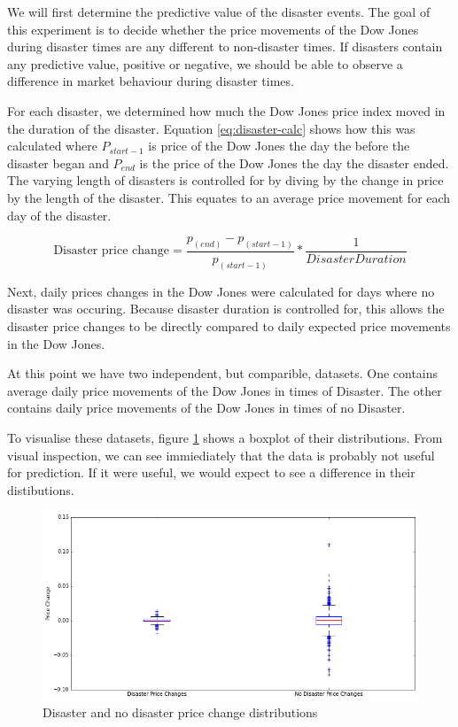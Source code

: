 \documentclass{report}
\begin{document}
We will first determine the predictive value of the disaster events. The goal of this experiment is to decide whether the price movements of the Dow Jones during disaster times are any different to non-disaster times. If disasters contain any predictive value, positive or negative, we should be able to observe a difference in market behaviour during disaster times.

For each disaster, we determined how much the Dow Jones price index moved in the duration of the disaster. Equation \ref{eq:disaster-calc} shows how this was calculated where $P_{start - 1}$ is price of the Dow Jones the day the before the disaster began and $P_{end}$ is the price of the Dow Jones the day the disaster ended. The varying length of disasters is controlled for by diving by the change in price by the length of the disaster. This equates to an average price movement for each day of the disaster. 

\begin{figure}[H]
\begin{center}
    \begin{equation}
      \text{Disaster price change} = \dfrac{p_{(end)} - p_{(start - 1)}} {p_{(start - 1)}} * \dfrac{1}{Disaster Duration}
      \label{eq:disaster-calc}
    \end{equation}
\end{center}
\end{figure}

Next, daily prices changes in the Dow Jones were calculated for days where no disaster was occuring. Because disaster duration is controlled for, this allows the disaster price changes to be directly compared to daily expected price movements in the Dow Jones.

At this point we have two independent, but comparible, datasets. One contains average daily price movements of the Dow Jones in times of Disaster. The other contains daily price movements of the Dow Jones in times of no Disaster. 

To visualise these datasets, figure \ref{fig:disaster-box} shows a boxplot of their distributions. From visual inspection, we can see immiediately that the data is probably not useful for prediction. If it were useful, we would expect to see a difference in their distibutions.

\begin{figure}[H]
	\caption{Disaster and no disaster price change distributions}
	\centerline{\includegraphics[width=\textwidth]{vis/disaster_box.png}}
	\label{fig:disaster-box}
\end{figure}
\end{document}
